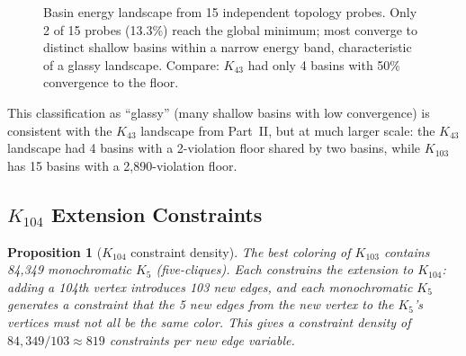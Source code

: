 \documentclass[11pt,a4paper]{article}
\theoremstyle{plain}
\newtheorem{proposition}[theorem]{Proposition}
\theoremstyle{remark}
\begin{document}
\begin{figure}[H]
\centering
{}
\caption{Basin energy landscape from 15 independent topology probes.
  Only 2 of 15 probes (13.3\%) reach the global minimum; most converge
  to distinct shallow basins within a narrow energy band, characteristic
  of a glassy landscape. Compare: $K_{43}$ had only 4 basins with 50\%
  convergence to the floor.}
\label{fig:basin-energy}
\end{figure}

This classification as ``glassy'' (many shallow basins with low
convergence) is consistent with the $K_{43}$ landscape from
Part~II, but at much larger scale: the $K_{43}$ landscape had
4 basins with a 2-violation floor shared by two basins, while
$K_{103}$ has 15 basins with a 2{,}890-violation floor.

\subsection{$K_{104}$ Extension Constraints}

\begin{proposition}[$K_{104}$ constraint density]\label{prop:k104}
The best coloring of $K_{103}$ contains 84{,}349 monochromatic
$K_5$ (five-cliques). Each constrains the extension to $K_{104}$:
adding a 104th vertex introduces 103 new edges, and each
monochromatic $K_5$ generates a constraint that the 5 new edges
from the new vertex to the $K_5$'s vertices must not all be the
same color. This gives a constraint density of
$84{,}349 / 103 \approx 819$ constraints per new edge variable.
\end{proposition}
\end{document}
